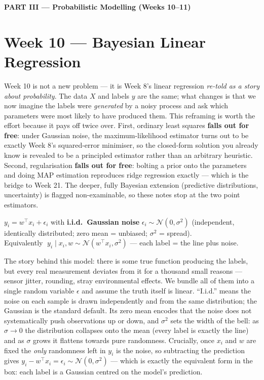 \documentclass[11pt, a4paper]{article}
\newcommand{\kw}[1]{\textbf{#1}}
\begin{document}
\begin{center}\large\bfseries\color{defBd} PART III — Probabilistic Modelling (Weeks 10–11)\end{center}

\section{Week 10 — Bayesian Linear Regression}

Week 10 is not a new problem — it is Week 8's linear regression \emph{re-told as a story about
probability}. The data $X$ and labels $y$ are the same; what changes is that we now imagine the
labels were \emph{generated} by a noisy process and ask which parameters were most likely to have
produced them. This reframing is worth the effort because it pays off twice over. First, ordinary
least squares \kw{falls out for free}: under Gaussian noise, the maximum-likelihood estimator turns
out to be exactly Week 8's squared-error minimiser, so the closed-form solution you already know is
revealed to be a principled estimator rather than an arbitrary heuristic. Second, regularisation
\kw{falls out for free}: bolting a prior onto the parameters and doing MAP estimation reproduces
ridge regression exactly — which is the bridge to Week 21. The deeper, fully Bayesian extension
(predictive distributions, uncertainty) is flagged non-examinable, so these notes stop at the two
point estimators.

\begin{setupbox}
$y_i=w^\top x_i+\epsilon_i$ with \kw{i.i.d.\ Gaussian noise} $\epsilon_i\sim\mathcal N(0,\sigma^2)$
(independent, identically distributed; zero mean = unbiased; $\sigma^2$ = spread). \\
Equivalently $\;y_i\mid x_i,w\sim\mathcal N(w^\top x_i,\sigma^2)$ — each label = the line plus noise.
\end{setupbox}

The story behind this model: there is some true function producing the labels, but every real
measurement deviates from it for a thousand small reasons — sensor jitter, rounding, stray
environmental effects. We bundle all of them into a single random variable $\epsilon$ and assume the
truth itself is linear. ``I.i.d.'' means the noise on each sample is drawn independently and from the
same distribution; the Gaussian is the standard default. Its zero mean encodes that the noise does
not systematically push observations up or down, and $\sigma^2$ sets the width of the bell: as
$\sigma\to0$ the distribution collapses onto the mean (every label is exactly the line) and as
$\sigma$ grows it flattens towards pure randomness. Crucially, once $x_i$ and $w$ are fixed the
\emph{only} randomness left in $y_i$ is the noise, so subtracting the prediction gives
$y_i-w^\top x_i=\epsilon_i\sim\mathcal N(0,\sigma^2)$ — which is exactly the equivalent form in the
box: each label is a Gaussian centred on the model's prediction.
\end{document}
